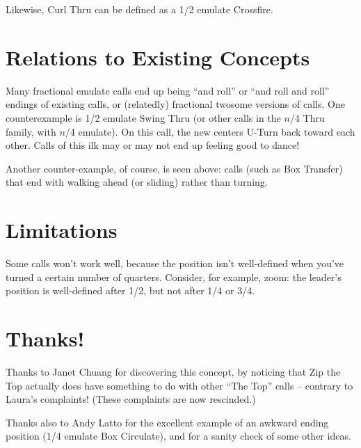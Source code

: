 \documentclass[11pt]{article}
\begin{document}


Likewise, Curl Thru can be defined
as a 1/2 emulate Crossfire.

\section{Relations to Existing Concepts}

Many fractional emulate calls end up being ``and roll'' or ``and roll and
roll'' endings of existing calls,
or (relatedly) fractional twosome versions of calls.
One counterexample is 1/2 emulate Swing Thru
(or other calls in the $n$/4 Thru family, with $n$/4 emulate).
On this call, the new centers U-Turn back toward each other.
Calls of this ilk may or may not end up feeling good to dance!

Another counter-example, of course, is seen above:
calls (such as Box Transfer) that end with walking ahead
(or sliding) rather than turning.

\section{Limitations}

Some calls won't work well, because the position isn't well-defined
when you've turned a certain number of quarters.  Consider, for
example, zoom: the leader's position is well-defined after 1/2, but
not after 1/4 or 3/4.


\section{Thanks!}

Thanks to Janet Chuang for discovering this concept,
by noticing that Zip the Top actually does have something to do
with other ``The Top'' calls -- contrary to Laura's complaints!
(These complaints are now rescinded.)

Thanks also to Andy Latto for the excellent example
of an awkward ending position (1/4 emulate Box Circulate),
and for a sanity check of some other ideas.
\end{document}
